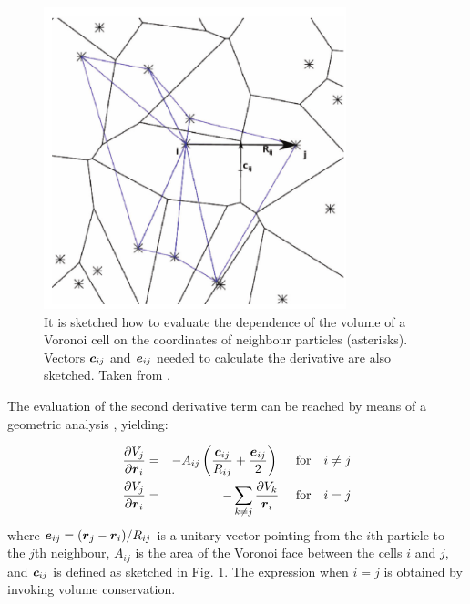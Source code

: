 \documentclass[a4,useAMS,usenatbib,usegraphicx,12pt]{article}
\begin{document}
\begin{figure}[h]
\centering

  \includegraphics[trim = 0mm 0mm 0mm 0mm, clip, keepaspectratio=true,
  width=0.25\textheight]{./figures/VoronoiVolume.png}
  
  \caption{\small It is sketched how to evaluate the dependence of the volume
  of a Voronoi cell on the coordinates of neighbour particles (asterisks). 
  Vectors $\boldsymbol{ c }_{ij}$ and $\boldsymbol{ e }_{ij}$ needed to calculate the derivative
  are also sketched. Taken from \citet{Hess10}. }

  \label{fig:VoronoiVolume}

\end{figure}

The evaluation of the second derivative term can be reached by means of a 
geometric analysis \citep{Serrano01}, yielding:

\begin{eqnarray}
\nonumber{}
\frac{\partial V_j}{\partial \boldsymbol{ r }_i} &=& -A_{ij}\left(  \frac{\boldsymbol{ c }_{ij}}{R_{ij}}
+ \frac{\boldsymbol{ e }_{ij}}{2}  \right) \ \ \ \ \mbox{for}\ \ \ i\neq j \\
\label{VoronoiVolume}
\frac{\partial V_j}{\partial \boldsymbol{ r }_i} &=& -\sum_{k\neq j}\frac{\partial V_k}{\boldsymbol{ r }_i} \ \ \ \ \mbox{for}\ \ \ i=j
\end{eqnarray}
where $\boldsymbol{ e }_{ij} = (\boldsymbol{ r }_j - \boldsymbol{ r }_i )/R_{ij}$ is a unitary vector 
pointing from the $i$th particle to the $j$th neighbour, $A_{ij}$ is the area 
of the Voronoi face between the cells $i$ and $j$, and $\boldsymbol{ c }_{ij}$ is defined
as sketched in Fig. \ref{fig:VoronoiVolume}. The expression when $i=j$ is 
obtained by invoking volume conservation.
\end{document}
